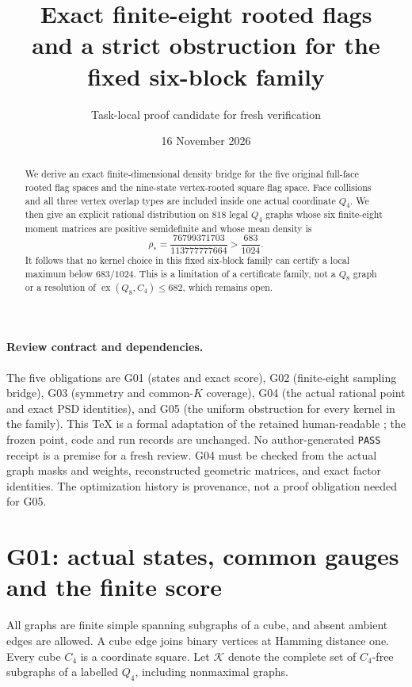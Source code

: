 \documentclass[11pt]{article}
\title{Exact finite-eight rooted flags\\and a strict obstruction for the fixed six-block family}
\author{Task-local proof candidate for fresh verification}
\date{16 November 2026}
\newcommand{\file}[1]{\texttt{\detokenize{#1}}}
\begin{document}
\maketitle

\begin{abstract}
We derive an exact finite-dimensional density bridge for the five original
full-face rooted flag spaces and the nine-state vertex-rooted square flag
space.  Face collisions and all three vertex overlap types are included
inside one actual coordinate \(Q_4\).  We then give an explicit rational
distribution on \(818\) legal \(Q_4\) graphs whose six finite-eight moment
matrices are positive semidefinite and whose mean density is
\[
 \rho_*=\frac{76799371703}{113777777664}
       >\frac{683}{1024}.
\]
It follows that no kernel choice in this fixed six-block family can certify
a local maximum below \(683/1024\).  This is a limitation of a certificate
family, not a \(Q_8\) graph or a resolution of
\(\operatorname{ex}(Q_8,C_4)\le682\), which remains open.
\end{abstract}

\paragraph{Review contract and dependencies.}
The five obligations are G01 (states and exact score),
G02 (finite-eight sampling bridge), G03 (symmetry and common-\(K\) coverage),
G04 (the actual rational point and exact PSD identities), and
G05 (the uniform obstruction for every kernel in the family).
This TeX is a formal adaptation of the retained human-readable
\file{FINITE8_BRIDGE_AND_OBSTRUCTION.md}; the frozen point, code and run
records are unchanged.
No author-generated \texttt{PASS} receipt is a premise for a fresh review.
G04 must be checked from the actual graph masks and weights, reconstructed
geometric matrices, and exact factor identities.  The optimization history
is provenance, not a proof obligation needed for G05.

\section{G01: actual states, common gauges and the finite score}

All graphs are finite simple spanning subgraphs of a cube, and absent
ambient edges are allowed.  A cube edge joins binary vertices at Hamming
distance one.  Every cube \(C_4\) is a coordinate square.
Let \(\mathcal K\) denote the complete set of \(C_4\)-free subgraphs of a
labelled \(Q_4\), including nonmaximal graphs.
\end{document}

